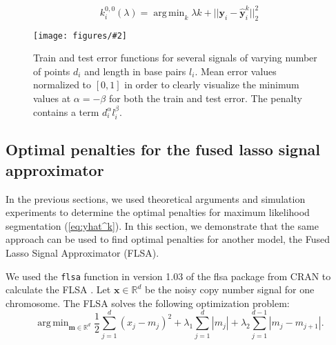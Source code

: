 \documentclass{jsfds} %
\newcommand{\fig}[3][H]{
  \begin{figure}[#1]
    \hskip -1cm
    
    \caption{#3}
    \label{fig:#2}
  \end{figure}
}
\newcommand{\figpdf}[3][H]{
  \begin{figure}[#1]
    \hskip -1cm
    \texttt{[image: figures/\#2]}
    \caption{#3}
    \label{fig:#2}
  \end{figure}
}
\DeclareMathOperator*{\argmin}{arg\,min}
\newcommand{\RR}{\mathbb{R}}
\begin{document}
\begin{equation}
  \label{eq:kstar_composite_same}
  k_i^{0,0}(\lambda) = 
\argmin_k \lambda k + ||\mathbf y_i - \mathbf{\hat y}_i^k||^2_2
\end{equation}

\figpdf{variable-size-error-alpha-beta}{Train and test error functions
  for several signals of varying number of points $d_i$ and length in
  base pairs $l_i$. Mean error values normalized to $[0,1]$ in order
  to clearly visualize the minimum values at $\alpha = -\beta$ for
  both the train and test error. The penalty contains a term
  $d_i^\alpha l_i^\beta$.}






\newpage
\subsection{Optimal penalties for the fused lasso signal approximator}

In the previous sections, we used theoretical arguments and simulation
experiments to determine the optimal penalties for maximum likelihood
segmentation (\ref{eq:yhat^k}). In this section, we demonstrate that
the same approach can be used to find optimal penalties for another
model, the Fused Lasso Signal Approximator (FLSA).

We used the \verb|flsa| function in version 1.03 of the flsa
package from CRAN to calculate the FLSA \citep{fused-lasso-path}. Let
$\mathbf x\in\RR^d$ be the noisy copy number signal for one chromosome. The
FLSA solves the following optimization problem:
\begin{equation}
  \label{eq:flsa}
\argmin_{\mathbf m\in\RR^d} 
\frac 1 2 \sum_{j=1}^d (x_j-m_j)^2
+\lambda_1\sum_{j=1}^d|m_j|
+\lambda_2\sum_{j=1}^{d-1}|m_j-m_{j+1}|.
\end{equation}
\end{document}
